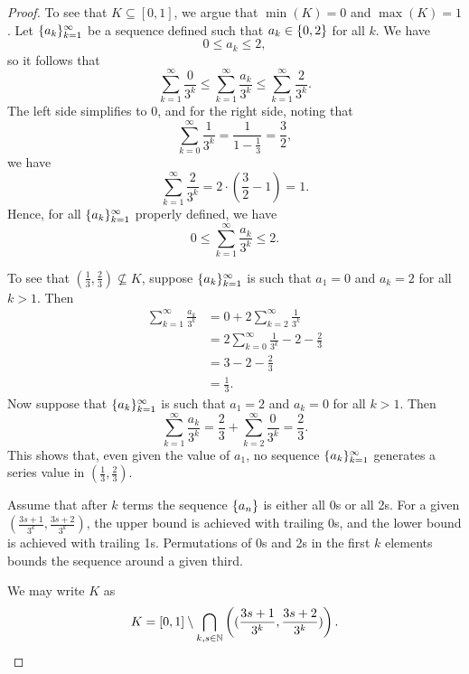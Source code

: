 \begin{proof}
    To see that $K \subseteq [0,1]$, we argue that $\min(K) = 0$ and $\max(K) =
    1$. Let $\{a_k\}_{k=1}^{\infty}$ be a sequence defined such that $a_k \in
    \{0,2\}$ for all $k$. We have 
    \[
        0 \leq a_k \leq 2,
    \]
    so it follows that
    \[
        \sum_{k=1}^{\infty} \frac{0}{3^k} \leq
        \sum_{k=1}^{\infty} \frac{a_k}{3^k} \leq
        \sum_{k=1}^{\infty} \frac{2}{3^k}.
    \]
    The left side simplifies to $0$, and for the right side, noting that
    \[
        \sum_{k=0}^{\infty} \frac{1}{3^k} = \frac{1}{1-\frac{1}{3}} =
        \frac{3}{2},
    \]
    we have 
    \[
        \sum_{k=1}^{\infty} \frac{2}{3^k} = 2 \cdot \left( \frac{3}{2} -
        1\right) = 1.        
    \]
    Hence, for all $\{a_k\}_{k=1}^{\infty}$ properly defined, we have 
    \[
        0 \leq \sum_{k=1}^{\infty} \frac{a_k}{3^k} \leq 2.
    \]

    To see that $(\frac{1}{3}, \frac{2}{3}) \not \subseteq K$, suppose
    $\{a_k\}_{k=1}^{\infty}$ is such that $a_1 = 0$ and $a_k = 2$ for all $k >
    1$. Then
    \begin{align*}
        \sum_{k=1}^{\infty} \frac{a_k}{3^k} &= 0 + 2\sum_{k=2}^{\infty}
        \frac{1}{3^k} \\
        &= 2\sum_{k=0}^{\infty} \frac{1}{3^k} - 2 - \frac{2}{3} \\
        &= 3 - 2  - \frac{2}{3} \\
        &= \frac{1}{3}.
    \end{align*}
    Now suppose that $\{a_k\}_{k=1}^{\infty}$ is such that $a_1 = 2$ and $a_k
    = 0$ for all $k > 1$. Then
    \[
        \sum_{k=1}^{\infty} \frac{a_k}{3^k} = \frac{2}{3} + \sum_{k=2}^{\infty}
        \frac{0}{3^k} = \frac{2}{3}.
    \]
    This shows that, even given the value of $a_1$, no sequence
    $\{a_k\}_{k=1}^{\infty}$ generates a series value in
    $(\frac{1}{3}, \frac{2}{3})$.

    Assume that after $k$ terms the sequence $\{a_n\}$ is either all 0s or all
    2s. For a given $(\frac{3s+1}{3^k}, \frac{3s+2}{3^k})$, the upper bound is
    achieved with trailing 0s, and the lower bound is achieved with trailing 1s.
    Permutations of 0s and 2s in the first $k$ elements bounds the sequence
    around a given third.

    We may write $K$ as 
    \[
        K = [0,1] \setminus \bigcap_{k, s \in \mathbb{N}} \left((\frac{3s+1}{3^k},
        \frac{3s+2}{3^k})\right).
    \]
\end{proof}


